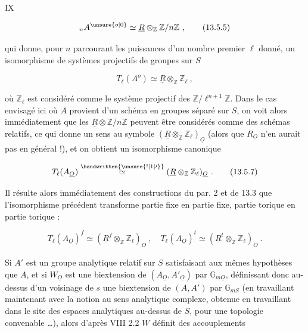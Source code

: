 

IX

\[
 {}_n A^{\unsure{o|0}}\simeq\underline R\otimes_{\mathbb Z}\mathbb Z/n\mathbb Z\ , \tag*{(13.5.5)}
\]

qui donne, pour $n$ parcourant les puissances d'un nombre premier $\ell$ donné, un isomorphisme de systèmes projectifs de groupes sur $S$

\[
 T_\ell(A^o)\simeq\underline R\otimes_{\mathbb Z}\mathbb Z_\ell\ , \tag*{(13.5.6)}
\]

où $\mathbb Z_\ell$ est considéré comme le système projectif des $\mathbb Z/\ell^{n+1}\mathbb Z$. Dans le cas envisagé ici où $A$ provient d'un schéma en groupes séparé sur $S$, on voit alors immédiatement que les $\underline R\otimes\mathbb Z/n\mathbb Z$ peuvent être considérés comme des schémas relatifs, ce qui donne un sens au symbole $(\underline R\otimes_{\mathbb Z}\mathbb Z_\ell)_{\underline O}$ (alors que $R_{\underline O}$ n'en aurait pas en général !), et on obtient un isomorphisme canonique

\[
 T_\ell(A_{\underline O})\overset{\handwritten{\unsure{!|1|\prime}}}{\simeq}(\underline R\otimes_{\mathbb Z}\mathbb Z_\ell)_{\underline O}\ . \tag*{(13.5.7)}
\]

Il résulte alors immédiatement des constructions du par. 2 et de 13.3 que l'isomorphisme précédent transforme partie fixe en partie fixe, partie torique en partie torique :

\[
 T_\ell(A_{\underline O})^f\simeq(\underline R^f\otimes_{\mathbb Z}\mathbb Z_\ell)_{\underline O}\ ,\quad T_\ell(A_{\underline O})^t\simeq(\underline R^t\otimes_{\mathbb Z}\mathbb Z_\ell)_{\underline O}\ . \tag*{(13.5.8)}
\]

Si $A'$ est un groupe analytique relatif sur $S$ satisfaisant aux mêmes hypothèses que $A$, et si $W_{\underline O}$ est une biextension de $(A_{\underline O},A'_{\underline O})$ par $\mathbb G_{m\underline O}$, définissant donc au-dessus d'un voisinage de $s$ une biextension de $(A,A')$ par $\mathbb G_{mS}$ (en travaillant maintenant avec la notion au sens analytique complexe, obtenue en travaillant dans le site des espaces analytiques au-dessus de $S$, pour une topologie convenable \ldots), alors d'après VIII 2.2 $W$ définit des accouplements



